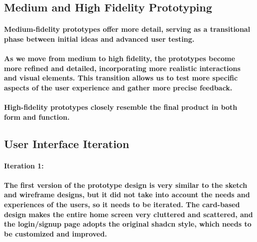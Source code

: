 \subsection{Medium and High Fidelity Prototyping}
\paragraph{Medium-fidelity prototypes offer more detail, serving as a transitional phase between initial ideas and advanced user testing.}

\paragraph{As we move from medium to high fidelity, the prototypes become more refined and detailed, incorporating more realistic interactions and visual elements. This transition allows us to test more specific aspects of the user experience and gather more precise feedback.}

\paragraph{High-fidelity prototypes closely resemble the final product in both form and function.}


\subsection{User Interface Iteration}
\paragraph{Iteration 1:}

\paragraph{The first version of the prototype design is very similar to the sketch and wireframe designs, but it did not take into account the needs and experiences of the users, so it needs to be iterated. The card-based design makes the entire home screen very cluttered and scattered, and the login/signup page adopts the original shadcn style, which needs to be customized and improved.}


